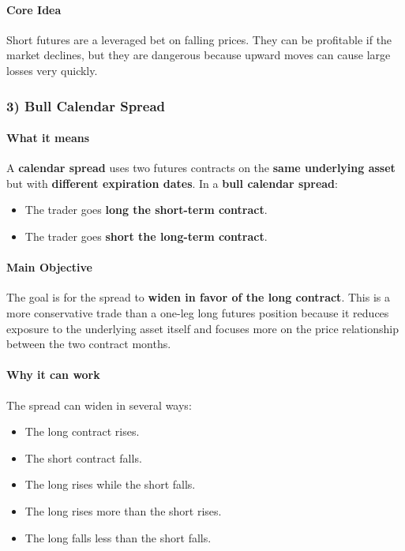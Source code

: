 \documentclass[12pt,openany]{book}
\begin{document}
\paragraph{Core Idea}

Short futures are a leveraged bet on falling prices. They can be profitable if the market declines, but they are dangerous because upward moves can cause large losses very quickly.

\subsubsection{3) Bull Calendar Spread}

\paragraph{What it means}

A \textbf{calendar spread} uses two futures contracts on the \textbf{same underlying asset} but with \textbf{different expiration dates}. In a \textbf{bull calendar spread}:

\begin{itemize}[leftmargin=*]
    \item The trader goes \textbf{long the short-term contract}.
    \item The trader goes \textbf{short the long-term contract}.
\end{itemize}

\paragraph{Main Objective}

The goal is for the spread to \textbf{widen in favor of the long contract}. This is a more conservative trade than a one-leg long futures position because it reduces exposure to the underlying asset itself and focuses more on the price relationship between the two contract months.

\paragraph{Why it can work}

The spread can widen in several ways:

\begin{itemize}[leftmargin=*]
    \item The long contract rises.
    \item The short contract falls.
    \item The long rises while the short falls.
    \item The long rises more than the short rises.
    \item The long falls less than the short falls.
\end{itemize}
\end{document}
